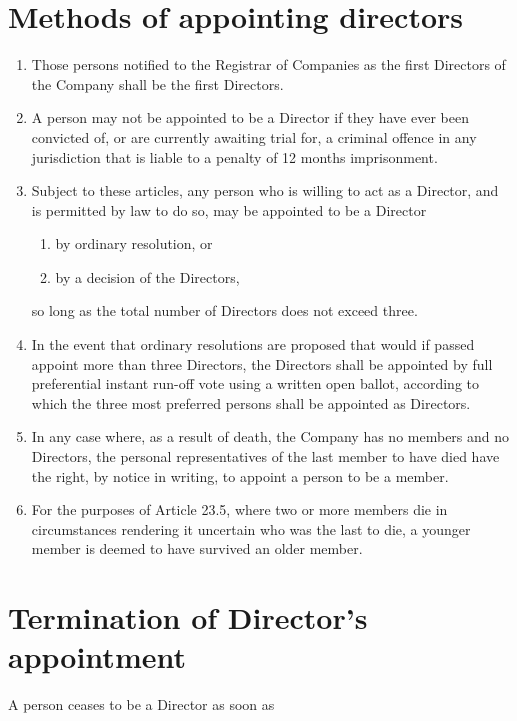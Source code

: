 \documentclass[a4paper,12pt]{article}
\renewcommand{\labelenumii}{(\alph{enumii})}
\begin{document}
\section{Methods of appointing directors}

\begin{enumerate}
  \item Those persons notified to the Registrar of Companies as the first Directors of the Company shall be the first Directors.
  \item A person may not be appointed to be a Director if they have ever been convicted of, or are currently awaiting trial for, a criminal offence in any jurisdiction that is liable to a penalty of 12 months imprisonment.
  \item Subject to these articles, any person who is willing to act as a Director, and is permitted by law to do so, may be appointed to be a Director
  \begin{enumerate}
    \renewcommand{\labelenumii}{(\alph{enumii})}
    \item by ordinary resolution, or
    \item by a decision of the Directors,
  \end{enumerate}
  so long as the total number of Directors does not exceed three.
  \item In the event that ordinary resolutions are proposed that would if passed appoint more than three Directors, the Directors shall be appointed by full preferential instant run-off vote using a written open ballot, according to which the three most preferred persons shall be appointed as Directors.
  \item In any case where, as a result of death, the Company has no members and no Directors, the personal representatives of the last member to have died have the right, by notice in writing, to appoint a person to be a member.
  \item For the purposes of Article 23.5, where two or more members die in circumstances rendering it uncertain who was the last to die, a younger member is deemed to have survived an older member.
\end{enumerate}

\section{Termination of Director's appointment}

A person ceases to be a Director as soon as
\end{document}
